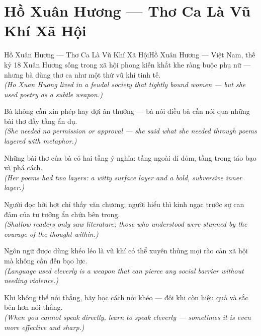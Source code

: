 \section{Hồ Xuân Hương --- Thơ Ca Là Vũ Khí Xã Hội}
\begin{truyen}{Hồ Xuân Hương --- Thơ Ca Là Vũ Khí Xã Hội}{Hồ Xuân Hương --- Việt Nam, thế kỷ 18}
 Xuân Hương sống trong xã hội phong kiến khắt khe ràng buộc phụ nữ --- nhưng bà dùng thơ ca như một thứ vũ khí tinh tế.\\[4pt]
\textit{(Ho Xuan Huong lived in a feudal society that tightly bound women --- but she used poetry as a subtle weapon.)}

Bà không cần xin phép hay đợi ân thưởng --- bà nói điều bà cần nói qua những bài thơ đầy tầng ẩn dụ.\\[4pt]
\textit{(She needed no permission or approval --- she said what she needed through poems layered with metaphor.)}

Những bài thơ của bà có hai tầng ý nghĩa: tầng ngoài dí dỏm, tầng trong táo bạo và phá cách.\\[4pt]
\textit{(Her poems had two layers: a witty surface layer and a bold, subversive inner layer.)}

Người đọc hời hợt chỉ thấy văn chương; người hiểu thì kinh ngạc trước sự can đảm của tư tưởng ẩn chứa bên trong.\\[4pt]
\textit{(Shallow readers only saw literature; those who understood were stunned by the courage of the thought within.)}

Ngôn ngữ được dùng khéo léo là vũ khí có thể xuyên thủng mọi rào cản xã hội mà không cần đến bạo lực.\\[4pt]
\textit{(Language used cleverly is a weapon that can pierce any social barrier without needing violence.)}

\end{truyen}
\begin{baihoc}
  Khi không thể nói thẳng, hãy học cách nói khéo --- đôi khi còn hiệu quả và sắc bén hơn nói thẳng.\\[4pt]
  \textit{(When you cannot speak directly, learn to speak cleverly --- sometimes it is even more effective and sharp.)}
\end{baihoc}

